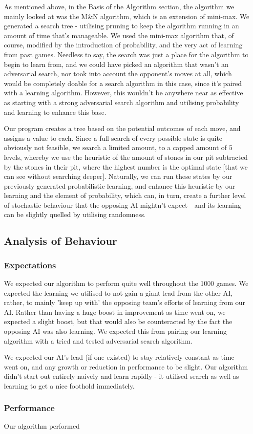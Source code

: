 \documentclass[11pt]{article}
\begin{document}
As mentioned above, in the Basis of the Algorithm section, the algorithm we mainly looked at was the M\&N algorithm, which is an extension of mini-max. We generated a search tree - utilising pruning to keep the algorithm running in an amount of time that's manageable. We used the mini-max algorithm that, of course, modified by the introduction of probability, and the very act of learning from past games. Needless to say, the search was just a place for the algorithm to begin to learn from, and we could have picked an algorithm that wasn't an adversarial search, nor took into account the opponent's moves at all, which would be completely doable for a search algorithm in this case, since it's paired with a learning algorithm. However, this wouldn't be anywhere near as effective as starting with a strong adversarial search algorithm and utilising probability and learning to enhance this base.

Our program creates a tree based on the potential outcomes of each move, and assigns a value to each. Since a full search of every possible state is quite obviously not feasible, we search a limited amount, to a capped amount of 5 levels, whereby we use the heuristic of the amount of stones in our pit subtracted by the stones in their pit, where the highest number is the optimal state [that we can see without searching deeper]. Naturally, we can run these states by our previously generated probabilistic learning, and enhance this heuristic by our learning and the element of probability, which can, in turn, create a further level of stochastic behaviour that the opposing AI mightn't expect - and its learning can be slightly quelled by utilising randomness.
\subsection{Analysis of Behaviour}
\label{sec-3-3}

\subsubsection{Expectations}
\label{sec-3-3-1}

We expected our algorithm to perform quite well throughout the 1000 games. We expected the learning we utilised to not gain a giant lead from the other AI, rather, to mainly 'keep up with' the opposing team's efforts of learning from our AI. Rather than having a huge boost in improvement as time went on, we expected a slight boost, but that would also be counteracted by the fact the opposing AI was also learning. We expected this from pairing our learning algorithm with a tried and tested adversarial search algorithm.

We expected our AI's lead (if one existed) to stay relatively constant as time went on, and any growth or reduction in performance to be slight. Our algorithm didn't start out entirely naively and learn rapidly - it utilised search as well as learning to get a nice foothold immediately.
\subsubsection{Performance}
\label{sec-3-3-2}

Our algorithm performed
\end{document}
